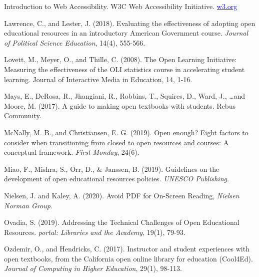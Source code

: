 \documentclass[11pt]{article}
\newcommand{\alink}[2]{\href{#1}{\textcolor{blue}{#2}}}
\begin{document}
\begin{thebibliography}{99}
   Introduction to Web Accessibility.  W3C Web Accessibility Initiative. \alink{w3.org}{w3.org}%

   Lawrence, C., and Lester, J. (2018). Evaluating the effectiveness of adopting open educational resources in an introductory American Government course. {\em Journal of Political Science Education}, 14(4), 555-566.

   Lovett, M., Meyer, O., and Thille, C. (2008). The Open Learning Initiative: Measuring the effectiveness of the OLI statistics course in accelerating student learning. Journal of Interactive Media in Education, 14, 1-16.

   Mays, E., DeRosa, R., Jhangiani, R., Robbins, T., Squires, D., Ward, J., \ldots and Moore, M. (2017). A guide to making open textbooks with students. Rebus Community.

   McNally, M. B., and Christiansen, E. G. (2019). Open enough? Eight factors to consider when transitioning from closed to open resources and courses: A conceptual framework. {\em First Monday}, 24(6).%

   Miao, F., Mishra, S., Orr, D., \& Janssen, B. (2019). Guidelines on the development of open educational resources policies. {\em UNESCO Publishing}.%

   Nielsen, J. and Kaley, A. (2020).  Avoid PDF for On-Screen Reading, {\em Nielsen Norman Group}.%
  
   Ovadia, S. (2019). Addressing the Technical Challenges of Open Educational Resources.  {\em portal: Libraries and the Academy}, 19(1), 79-93.%

   Ozdemir, O., and Hendricks, C. (2017). Instructor and student experiences with open textbooks, from the California open online library for education (Cool4Ed). {\em Journal of Computing in Higher Education}, 29(1), 98-113.


\end{thebibliography}
\end{document}
